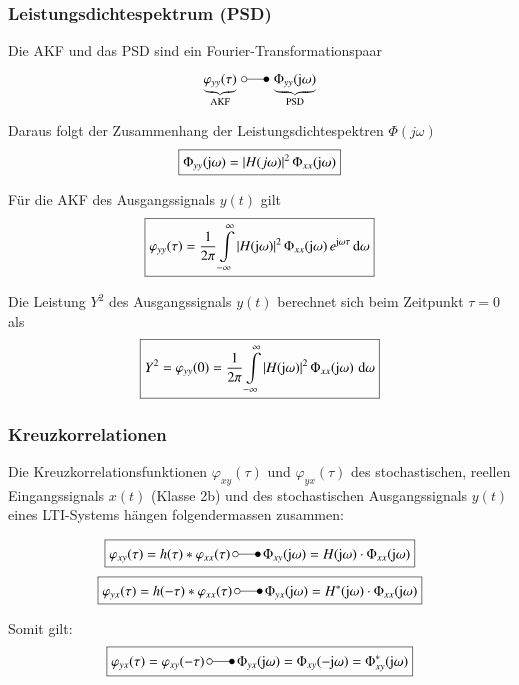 \subsubsection{Leistungsdichtespektrum (PSD)}

Die AKF und das PSD sind ein Fourier-Transformationspaar
$$ \underbrace{\varphi_{yy}(\tau)}_{\text{AKF}} \, \laplace \, \underbrace{\Phi_{yy}(\jimg  \omega)}_{\text{PSD}} $$

Daraus folgt der Zusammenhang der Leistungsdichtespektren $\Phi(j \omega)$
$$ \boxed{ \Phi_{yy}(\mathrm{j}  \omega) = |H(j \omega)|^2 \, \Phi_{xx}(\mathrm{j}  \omega) } $$

Für die AKF des Ausgangssignals $y(t)$ gilt 
$$ \boxed{ \varphi_{yy}(\tau) = \frac{1}{2 \pi} \int\limits_{- \infty}^{\infty} |H(\mathrm{j}  \omega)|^2 \, \Phi_{xx}(\mathrm{j}  \omega) \, e^{\mathrm{j}  \omega \tau} \mathop{} \! \mathrm{d} \omega } $$

Die Leistung $Y^2$ des Ausgangssignals $y(t)$ berechnet sich beim Zeitpunkt $\tau = 0$ als
$$ \boxed{ Y^2 = \varphi_{yy}(0) = \frac{1}{2 \pi} \int\limits_{- \infty}^{\infty} |H(\mathrm{j}  \omega)|^2 \, \Phi_{xx}(\mathrm{j}  \omega) \, \mathop{} \! \mathrm{d} \omega } $$


\subsubsection{Kreuzkorrelationen}

Die Kreuzkorrelationsfunktionen $\varphi_{xy}(\tau)$ und $\varphi_{yx}(\tau)$ des stochastischen, reellen Eingangssignals $x(t)$ 
(Klasse 2b) und des stochastischen Ausgangssignals $y(t)$ eines LTI-Systems hängen folgendermassen zusammen:

$$ \boxed{ \varphi_{xy}(\tau) = h(\tau) * \varphi_{xx}(\tau) \, \laplace \, \Phi_{xy}(\jimg  \omega) = H(\jimg  \omega) \cdot \Phi_{xx}(\jimg  \omega) } $$
$$ \boxed{ \varphi_{yx}(\tau) = h(-\tau) * \varphi_{xx}(\tau) \, \laplace \, \Phi_{yx}(\jimg  \omega) = H^*(\jimg  \omega) \cdot \Phi_{xx}(\jimg  \omega) } $$

Somit gilt:
$$ \boxed{ \varphi_{yx}(\tau) = \varphi_{xy}(-\tau) \, \laplace \, \Phi_{yx}(\jimg  \omega) = \Phi_{xy}(-\jimg  \omega) = \Phi^*_{xy}(\jimg  \omega) } $$

